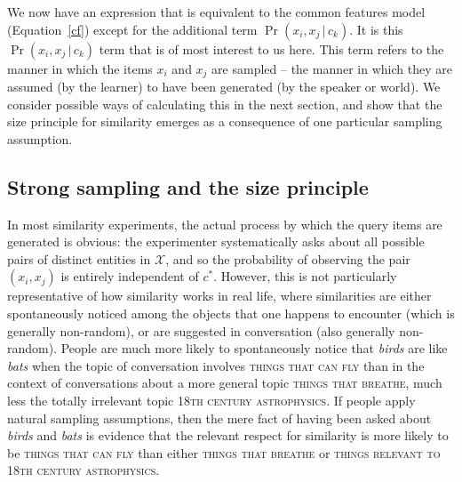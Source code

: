 \documentclass{apa}
\newcommand{\given}{\,|\,}
\newcommand{\exemplar}[1]{\textit{#1}}
\newcommand{\feature}[1]{\textsc{#1}}
\begin{document}
We now have an expression that is equivalent to the common features model (Equation~\ref{cf}) except for the additional term $\Pr(x_i,x_j \given c_k)$. It is this $\Pr(x_i, x_j \given c_k)$ term that is of most interest to us here. This term refers to the manner in which the items $x_i$ and $x_j$ are sampled -- the manner in which they are assumed (by the learner) to have been generated (by the speaker or world). We consider possible ways of calculating this in the next section, and show that the size principle for similarity emerges as a consequence of one particular sampling assumption.

\subsection{Strong sampling and the size principle}

In most similarity experiments, the actual process by which the query items are generated is obvious: the experimenter systematically asks about all possible pairs of distinct entities in $\mathcal{X}$, and so the probability of observing the pair $(x_i, x_j)$ is entirely independent of $c^*$. However, this is not particularly representative of how similarity works in real life, where similarities are either spontaneously noticed among the objects that one happens to encounter (which is generally non-random), or are suggested in conversation (also generally non-random). People are much more likely to spontaneously notice that \exemplar{birds} are like \exemplar{bats} when the topic of conversation involves \feature{things that can fly} than in the context of conversations about a more general topic \feature{things that breathe}, much less the totally irrelevant topic \feature{18th century astrophysics}. If people apply natural sampling assumptions, then the mere fact of having been asked about \exemplar{birds} and \exemplar{bats} is evidence that the relevant respect for similarity is more likely to be \feature{things that can fly} than either \feature{things that breathe} or \feature{things relevant to 18th century astrophysics}.
\end{document}
